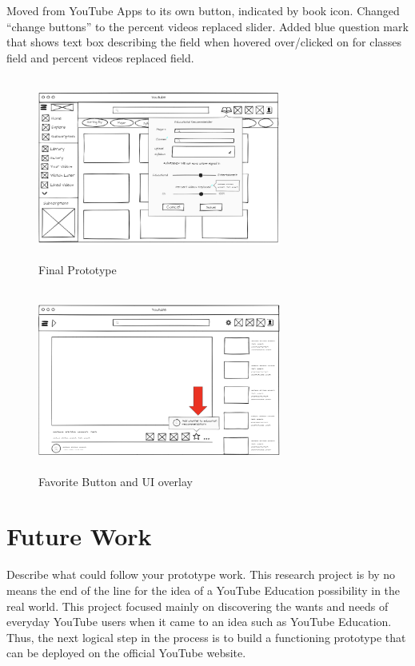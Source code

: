 \documentclass[letterpaper]{article} %
\begin{document}
Moved from YouTube Apps to its own button, indicated by book icon. Changed “change buttons” to the percent videos replaced slider. Added blue question mark that shows text box describing the field when hovered over/clicked on for classes field and percent videos replaced field.

\begin{figure}[h]
    \centering
    \includegraphics[width=8cm, height=6cm]{prototype.PNG}
    \caption{Final Prototype}
    \label{fig:prototype}
\end{figure}

\begin{figure}[h]
    \centering
    \includegraphics[width=8cm, height=6cm]{UI.png}
    \caption{Favorite Button and UI overlay}
    \label{fig:Favorite Button}
\end{figure}

\section{Future Work}
Describe what could follow your prototype work.
This research project is by no means the end of the line for the idea of a YouTube Education possibility in the real world. This project focused mainly on discovering the wants and needs of everyday YouTube users when it came to an idea such as YouTube Education. Thus, the next logical step in the process is to build a functioning prototype that can be deployed on the official YouTube website.
\end{document}
